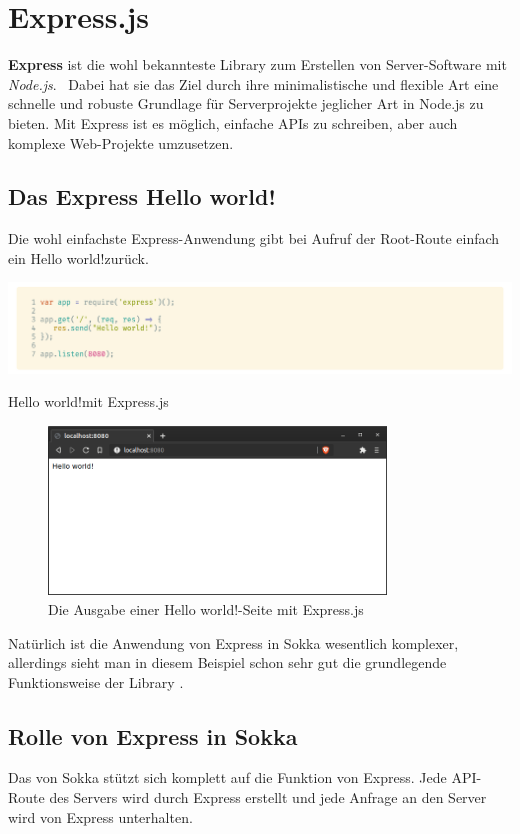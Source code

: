 \section{Express.js}

\textbf{Express} ist die wohl bekannteste Library zum Erstellen von Server-Software mit \textit{Node.js}.~\cite{serby2012} Dabei hat sie das Ziel durch ihre minimalistische und flexible Art eine schnelle und robuste Grundlage für Serverprojekte jeglicher Art in Node.js zu bieten. Mit Express ist es möglich, einfache APIs zu schreiben, aber auch komplexe Web-Projekte umzusetzen.

\subsection{Das Express \glqq Hello world!\grqq}

Die wohl einfachste Express-Anwendung gibt bei Aufruf der Root-Route einfach ein \glqq Hello world!\grqq\space zurück.

\begin{code}[htp]
    \begin{center}
        \includegraphics[width=1\textwidth]{images/Dependencies/express.png}
        \vspace{-25pt}
        \caption{\glqq Hello world!\grqq\space mit Express.js}
    \end{center}
\end{code}

\begin{figure}[ht]
    \centering
    \includegraphics[width=0.8\textwidth]{images/Dependencies/helloworld.png}
    \caption{Die Ausgabe einer \glqq Hello world!\grqq -Seite mit Express.js}
\end{figure}

Natürlich ist die Anwendung von Express in Sokka wesentlich komplexer, allerdings sieht man in diesem Beispiel schon sehr gut die grundlegende Funktionsweise der Library .

\subsection{Rolle von Express in Sokka}

Das  von Sokka stützt sich komplett auf die Funktion von Express. Jede API-Route des Servers wird durch Express erstellt und jede Anfrage an den Server wird von Express unterhalten.
